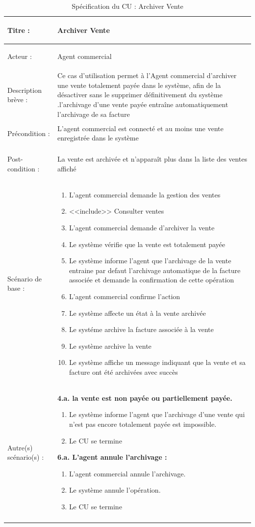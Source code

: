 \begin{longtable}{|>{\bfseries\raggedright\arraybackslash}p{3.5cm}|p{\dimexpr\textwidth-3.5cm-4\tabcolsep-2\arrayrulewidth}|}
\hline
Titre : & Archiver Vente \\
\hline
Acteur : & Agent commercial \\
\hline
Description brève : & Ce cas d'utilisation permet à l'Agent commercial d'archiver une vente totalement payée dans le système, afin de la désactiver sans le supprimer définitivement du système .l'archivage d'une vente payée entraîne automatiquement l'archivage de sa facture\\
\hline
Précondition : & L'agent commercial est connecté et au moins une vente enregistrée dans le système \\
\hline
Post-condition : & La vente est archivée et n'apparaît plus dans la liste des ventes affiché \\
\hline
Scénario de base : &
\begin{enumerate}[leftmargin=1.5em, topsep=2pt, itemsep=1pt]
  \item L'agent commercial demande la gestion des ventes
  \item <<include>> Consulter ventes
  \item L'agent commercial demande d'archiver la vente
  \item Le système vérifie que la vente est totalement payée
  \item Le système informe l'agent que l'archivage de la vente entraine par defaut l'archivage automatique de la facture associée et demande la confirmation de cette opération
  \item L'agent commercial confirme l'action
  \item Le système affecte un état à la vente archivée
  \item Le systéme archive la facture associée à la vente
  \item Le système archive la vente
  \item Le système affiche un message indiquant que la vente et sa facture ont été archivées avec succès
\end{enumerate} \\
\hline
Autre(s) scénario(s) : &
\textbf{4.a. la vente est non payée ou partiellement payée.}
\begin{enumerate}[leftmargin=1.5em, topsep=2pt, itemsep=1pt]
  \item Le système informe l'agent que l'archivage d'une vente qui n'est pas encore totalement payée est impossible.
  \item Le CU se termine
\end{enumerate}
\textbf{6.a. L'agent annule l'archivage :}
\begin{enumerate}[leftmargin=1.5em, topsep=2pt, itemsep=1pt]
  \item L'agent commercial annule l'archivage.
  \item Le système annule l'opération.
  \item Le CU se termine
\end{enumerate} \\
\hline
\caption{Spécification du CU : Archiver Vente}
\label{tab:cu-archiver-vente}
\end{longtable}


